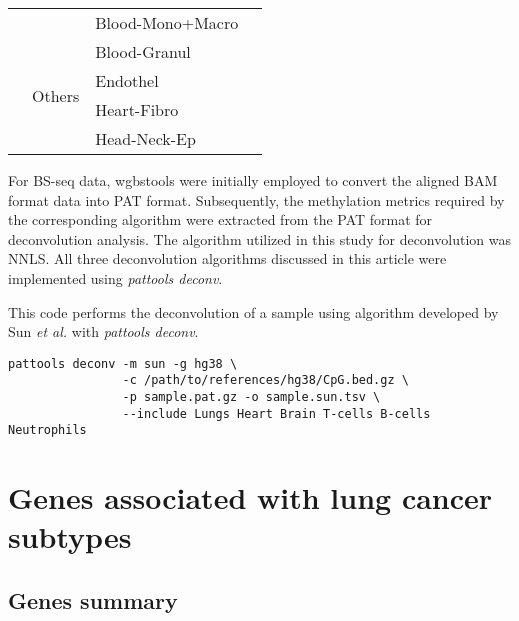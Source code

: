 \documentclass[12pt,letterpaper]{article}
\begin{document}
\begin{table}[H]
\begin{center}
\begin{tabular}{|l|l|l|l|}
            \cline{3-4}                             &                                             & Blood-Mono+Macro         &               \\
            \cline{3-4}                             &                                             & Blood-Granul             &               \\
            \cline{2-4}                             & \multirow{2}{*}{Others}                     & Endothel                 &               \\
            \cline{3-4}                             &                                             & Heart-Fibro              &               \\
            \cline{3-4}                             &                                             & Head-Neck-Ep             &               \\
            \hline
        \end{tabular}
    \end{center}
    \label{tab:deconvolution}
\end{table}

For BS-seq data, wgbstools\cite{Loyfer2024.05.08.593132} were initially employed to convert the
aligned BAM format data into PAT format. Subsequently, the methylation metrics required by the corresponding
algorithm were extracted from the PAT format for deconvolution analysis. The algorithm utilized in this
study for deconvolution was NNLS. All three deconvolution algorithms discussed in this article were
implemented using \textit{pattools deconv}.

This code performs the deconvolution of a sample using algorithm developed by Sun \textit{et al.} with \textit{pattools deconv}.

\begin{verbatim}
pattools deconv -m sun -g hg38 \
                -c /path/to/references/hg38/CpG.bed.gz \
                -p sample.pat.gz -o sample.sun.tsv \
                --include Lungs Heart Brain T-cells B-cells Neutrophils
\end{verbatim}

\section{Genes associated with lung cancer subtypes}\label{sec:genes}

\subsection{Genes summary}\label{sec:genes-summary}
\end{document}
